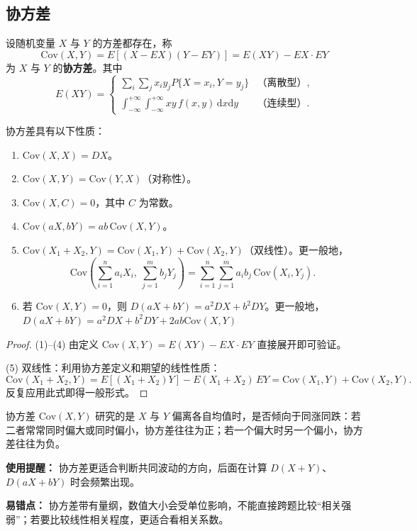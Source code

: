 ﻿\documentclass[lang=cn,11pt]{elegantbook}
\begin{document}
\subsection{协方差}

\begin{definition}[协方差] \label{def:covariance}
设随机变量 \(X\) 与 \(Y\) 的方差都存在，称
\[
\mathrm{Cov}(X,Y) = E[(X - EX)(Y - EY)] = E(XY) - EX \cdot EY
\]
为 \(X\) 与 \(Y\) 的\textbf{协方差}。其中
\[
E(XY) = \begin{cases}
\sum\limits_{i}\sum\limits_{j} x_i y_j P\{X=x_i,Y=y_j\} & \text{（离散型）}, \\[8pt]
\int_{-\infty}^{+\infty}\int_{-\infty}^{+\infty} xy\,f(x,y)\,\mathrm{d}x\mathrm{d}y & \text{（连续型）}.
\end{cases}
\]
\end{definition}

\begin{property}\label{prop:covariance}
协方差具有以下性质：
\begin{enumerate}
    \item \(\mathrm{Cov}(X,X) = DX\)。
    \item \(\mathrm{Cov}(X,Y) = \mathrm{Cov}(Y,X)\)（对称性）。
    \item \(\mathrm{Cov}(X,C) = 0\)，其中 \(C\) 为常数。
    \item \(\mathrm{Cov}(aX, bY) = ab\,\mathrm{Cov}(X,Y)\)。
    \item \(\mathrm{Cov}(X_1 + X_2, Y) = \mathrm{Cov}(X_1, Y) + \mathrm{Cov}(X_2, Y)\)（双线性）。更一般地，
    \[
    \mathrm{Cov}\!\left(\sum_{i=1}^{n} a_i X_i,\ \sum_{j=1}^{m} b_j Y_j\right) = \sum_{i=1}^{n}\sum_{j=1}^{m} a_i b_j\,\mathrm{Cov}(X_i, Y_j).
    \]
    \item 若 \(\mathrm{Cov}(X,Y) = 0\)，则 \(D(aX + bY) = a^2 DX + b^2 DY\)。更一般地，\(D(aX + bY) = a^2 DX + b^2 DY+2ab\mathrm{Cov}(X,Y) \)
\end{enumerate}
\end{property}
\begin{proof}
(1)--(4) 由定义 \(\mathrm{Cov}(X,Y)=E(XY)-EX\cdot EY\) 直接展开即可验证。\par
(5) 双线性：利用协方差定义和期望的线性性质：
\[
\mathrm{Cov}(X_1+X_2,Y) = E[(X_1+X_2)Y] - E(X_1+X_2)\,EY = \mathrm{Cov}(X_1,Y)+\mathrm{Cov}(X_2,Y).
\]
反复应用此式即得一般形式。
\end{proof}

\begin{note}
协方差 \(\mathrm{Cov}(X,Y)\) 研究的是 \(X\) 与 \(Y\) 偏离各自均值时，是否倾向于同涨同跌：若二者常常同时偏大或同时偏小，协方差往往为正；若一个偏大时另一个偏小，协方差往往为负。

\textbf{使用提醒：} 协方差更适合判断共同波动的方向，后面在计算 \(D(X+Y)\)、\(D(aX+bY)\) 时会频繁出现。

\textbf{易错点：} 协方差带有量纲，数值大小会受单位影响，不能直接跨题比较“相关强弱”；若要比较线性相关程度，更适合看相关系数。
\end{note}
\end{document}
